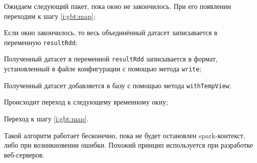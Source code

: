 \begin{enumerate_step}
    \item Ожидаем следующий пакет, пока окно не закончилось. 
    При его появлении переходим к шагу \ref{i:gbt:map};
    \item Если окно закончилось, то весь объединённый датасет записывается в переменную \texttt{resultRdd};
    \item Полученный датасет в переменной \texttt{resultRdd} записывается в формат, установленный в файле конфигурации с помощью метода \texttt{write};
    \item Полученный датасет добавляется в базу с помощью метода \texttt{withTempView};
    \item Происходит переход к следующему временному окну;
    \item Переход к шагу \ref{i:gbt:map}.
\end{enumerate_step}

Такой алгоритм работает бесконечно, пока не будет остановлен spark-контекст, либо при возникновении ошибки.
Похожий принцип используется при разработке веб-серверов.
